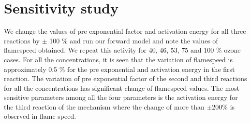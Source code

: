 \section{Sensitivity study}

  We
 change the values of pre exponential factor and activation energy for
 all three reactions by $\pm$ 100 $\% $ and run our forward model and
 note the values of flamespeed obtained. We repeat this activity for
 40, 46, 53, 75 and 100 $\%$ ozone cases. For all the concentrations,
 it is seen that the variation of flamespeed is approximately 0.5 $\%$ for
 the pre exponential and activation energy in the first reaction. The variation of pre exponential factor of the second
 and third reactions for all the concentrations has
 significant change of flamespeed values. The most sensitive
 parameters among all the four parameters is the activation energy for
 the third reaction of the mechanism where the change of more than
 $\pm 200\%$ is observed in flame speed.


